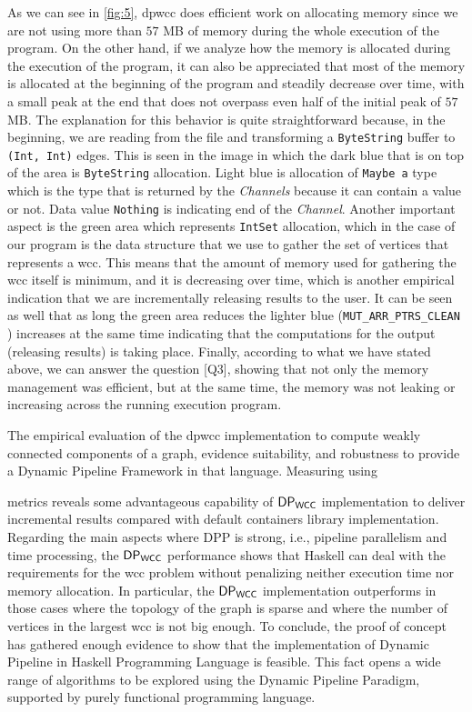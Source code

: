 As we can see in \autoref{fig:5}, \acrshort{dpwcc} does efficient work on allocating memory since we are not using more than $57$ MB of memory during the whole execution of the program.
On the other hand, if we analyze how the memory is allocated during the execution of the program, it can also be appreciated that most of the memory is allocated at the beginning of the program and steadily decrease over time, with a small peak at the end that does not overpass even half of the initial peak of $57$ MB. 
The explanation for this behavior is quite straightforward because, in the beginning, we are reading from the file and transforming a \texttt{ByteString} buffer to \texttt{(Int, Int)} edges. 
This is seen in the image in which the dark blue that is on top of the area is \texttt{ByteString} allocation. 
Light blue is allocation of \texttt{Maybe a} type which is the type that is returned by the \textit{Channels} because it can contain a value or not. 
Data value \texttt{Nothing} is indicating end of the \textit{Channel}. 
Another important aspect is the green area which represents \texttt{IntSet} allocation, which in the case of our program is the data structure that we use to gather the set of vertices that represents a \acrshort{wcc}. 
This means that the amount of memory used for gathering the \acrshort{wcc} itself is minimum, and it is decreasing over time, which is another empirical indication that we are incrementally releasing results to the user. 
It can be seen as well that as long the green area reduces the lighter blue (\texttt{MUT_ARR_PTRS_CLEAN} \cite{ghcheap}) increases at the same time indicating that the computations for the output (releasing results) is taking place. 
Finally, according to what we have stated above, we can answer the question [Q3], showing that not only the memory management was efficient, but at the same time, the memory was not leaking or increasing across the running execution program.

The empirical evaluation of the \acrshort{dpwcc} implementation to compute weakly connected components of a graph, evidence suitability, 
and robustness to provide a Dynamic Pipeline Framework in that language. Measuring using \par\bigskip metrics reveals some advantageous capability of $\mathsf{DP_{WCC}}$ implementation to deliver incremental results compared with default containers library implementation. 
Regarding the main aspects where DPP is strong, i.e., pipeline parallelism and time processing, the $\mathsf{DP_{WCC}}$ performance shows that Haskell 
can deal with the requirements for the \acrshort{wcc} problem without penalizing neither execution time nor memory allocation. 
In particular, the $\mathsf{DP_{WCC}}$ implementation outperforms in those cases where the topology of the graph is sparse and where the number of vertices in the largest \acrshort{wcc} is not big enough. 
To conclude, the proof of concept has gathered enough evidence to show that the implementation of Dynamic Pipeline in Haskell Programming Language is feasible. 
This fact opens a wide range of algorithms to be explored using the Dynamic Pipeline Paradigm, supported by purely functional programming language.

